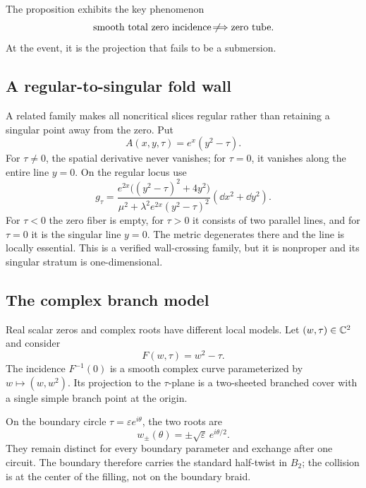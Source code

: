 The proposition exhibits the key phenomenon
\[
 \text{smooth total zero incidence}
 \not\!\Longrightarrow
 \text{zero tube}.
\]
At the event, it is the projection that fails to be a submersion.

\subsection{A regular-to-singular fold wall}

A related family makes all noncritical slices regular rather than retaining a
singular point away from the zero.  Put
\[
 A(x,y,\tau)=e^x(y^2-\tau).
\]
For $\tau\ne0$, the spatial derivative never vanishes; for $\tau=0$, it vanishes
along the entire line $y=0$.  On the regular locus use
\begin{equation}
 g_\tau=
 \frac{e^{2x}\bigl((y^2-\tau)^2+4y^2\bigr)}
 {\mu^2+\lambda^2e^{2x}(y^2-\tau)^2}
 (\dd x^2+\dd y^2).
 \label{eq:fold-wall-metric}
\end{equation}
For $\tau<0$ the zero fiber is empty, for $\tau>0$ it consists of two parallel
lines, and for $\tau=0$ it is the singular line $y=0$.  The metric degenerates
there and the line is locally essential.  This is a verified wall-crossing family,
but it is nonproper and its singular stratum is one-dimensional.

\subsection{The complex branch model}

Real scalar zeros and complex roots have different local models.  Let
$(w,\tau)\in\mathbb{C}^2$ and consider
\begin{equation}
 F(w,\tau)=w^2-\tau.
 \label{eq:complex-branch-model}
\end{equation}
The incidence $F^{-1}(0)$ is a smooth complex curve parameterized by
$w\mapsto(w,w^2)$.  Its projection to the $\tau$-plane is a two-sheeted branched
cover with a single simple branch point at the origin.

On the boundary circle $\tau=\varepsilon e^{i\theta}$, the two roots are
\begin{equation}
 w_\pm(\theta)=\pm\sqrt\varepsilon\,e^{i\theta/2}.
 \label{eq:half-twist-roots}
\end{equation}
They remain distinct for every boundary parameter and exchange after one circuit.
The boundary therefore carries the standard half-twist in $B_2$; the collision is
at the center of the filling, not on the boundary braid.

